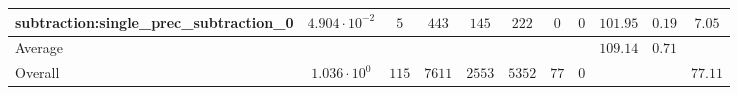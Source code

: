 \begin{tabular}{|l|c|c|c|c|c|c|c|c|c|c|}
subtraction:single\_prec\_subtraction\_0         & $ 4.904 \cdot 10^{-2} $ & $ 5      $ & $ 443  $ & $ 145  $ & $ 222   $ & $ 0  $ & $ 0 $ & $ 101.95      $ & $ 0.19    $ & $ 7.05    $ \\
\hline
Average                                          & $                     $ & $        $ & $      $ & $      $ & $       $ & $    $ & $   $ & $ 109.14      $ & $ 0.71    $ & $         $ \\
\hline
Overall                                          & $ 1.036 \cdot 10^{0}  $ & $ 115    $ & $ 7611 $ & $ 2553 $ & $ 5352  $ & $ 77 $ & $ 0 $ & $             $ & $         $ & $ 77.11   $ \\
\hline
\end{tabular}
